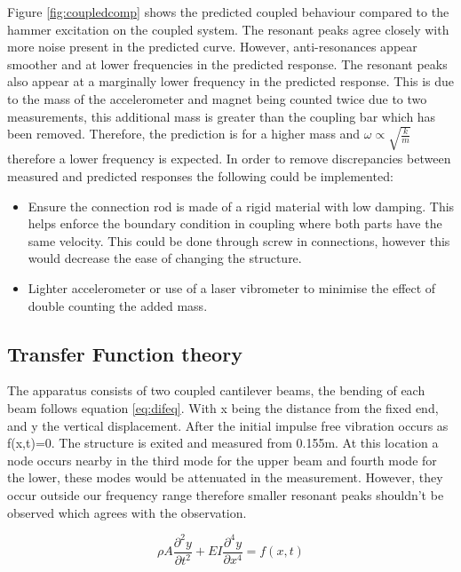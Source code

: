\documentclass[twoside,onecolumn]{article}
\begin{document}
Figure \ref{fig:coupledcomp} shows the predicted coupled behaviour compared to the hammer excitation on the coupled system. The resonant peaks agree closely with more noise present in the predicted curve. However, anti-resonances appear smoother and at lower frequencies in the predicted response. The resonant peaks also appear at a marginally lower frequency in the predicted response. This is due to the mass of the accelerometer and magnet being counted twice due to two measurements, this additional mass is greater than the coupling bar which has been removed. Therefore, the prediction is for a higher mass and $\omega \propto \sqrt{\frac{k}{m}}$ therefore a lower frequency is expected. 
\newline
In order to remove discrepancies between measured and predicted responses the following could be implemented:
\begin{itemize}
\item Ensure the connection rod is made of a rigid material with low damping. This helps enforce the boundary condition in coupling where both parts have the same velocity. This could be done through screw in connections, however this would decrease the ease of changing the structure.
\item Lighter accelerometer or use of a laser vibrometer to minimise the effect of double counting the added mass.
\end{itemize}


\subsection{Transfer Function theory}
The apparatus consists of two coupled cantilever beams, the bending of each beam follows equation \ref{eq:difeq}. With x being the distance from the fixed end, and y the vertical displacement. After the initial impulse free vibration occurs as f(x,t)=0. The structure is exited and measured from 0.155m. At this location a node occurs nearby in the third mode for the upper beam and fourth mode for the lower, these modes would be attenuated in the measurement. However, they occur outside our frequency range therefore smaller resonant peaks shouldn't be observed which agrees with the observation. 

\begin{equation}
\rho A\frac{\partial^2 y}{\partial t^2} + EI \frac{\partial^4y}{\partial x^4} = f(x,t)
\label{eq:difeq}
\end{equation}
\end{document}

